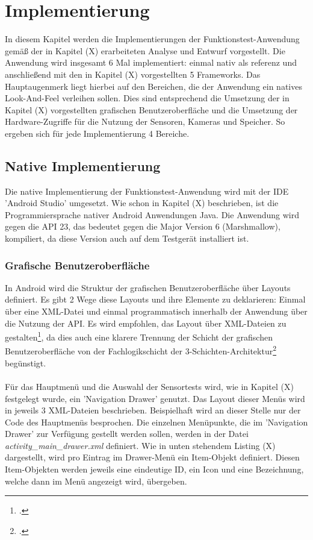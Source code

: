 \chapter{Implementierung}

In diesem Kapitel werden die Implementierungen der Funktionstest-Anwendung gemäß der in Kapitel (X) erarbeiteten Analyse und Entwurf vorgestellt. Die Anwendung wird insgesamt 6 Mal implementiert: einmal nativ als referenz und anschließend mit den in Kapitel (X)  vorgestellten 5 Frameworks. Das Hauptaugenmerk liegt hierbei auf den Bereichen, die der Anwendung ein natives Look-And-Feel verleihen sollen. Dies sind entsprechend die Umsetzung der in Kapitel (X) vorgestellten grafischen Benutzeroberfläche und die Umsetzung der Hardware-Zugriffe für die Nutzung der Sensoren, Kameras und Speicher. So ergeben sich für jede Implementierung 4 Bereiche.

\section{Native Implementierung}

Die native Implementierung der Funktionstest-Anwendung wird mit der IDE 'Android Studio' umgesetzt. Wie schon in Kapitel (X) beschrieben, ist die Programmiersprache nativer Android Anwendungen Java. Die Anwendung wird gegen die API 23, das bedeutet gegen die Major Version 6 (Marshmallow), kompiliert, da diese Version auch auf dem Testgerät installiert ist. 

\subsection{Grafische Benutzeroberfläche}

In Android wird die Struktur der grafischen Benutzeroberfläche über Layouts definiert. Es gibt 2 Wege diese Layouts und ihre Elemente zu deklarieren: Einmal über eine XML-Datei und einmal programmatisch innerhalb der Anwendung über die Nutzung der API. Es wird empfohlen, das Layout über XML-Dateien zu gestalten\footcite{AndroidAPI}, da dies auch eine klarere Trennung der Schicht der grafischen Benutzeroberfläche von der Fachlogikschicht der 3-Schichten-Architektur\footcite{SWTBalzert} begünstigt. 
\\
\\
Für das Hauptmenü und die Auswahl der Sensortests wird, wie in Kapitel (X) festgelegt wurde, ein 'Navigation Drawer' genutzt. Das Layout dieser Menüs wird in jeweils 3 XML-Dateien beschrieben. Beispielhaft wird an dieser Stelle nur der Code des Hauptmenüs besprochen. Die einzelnen Menüpunkte, die im 'Navigation Drawer' zur Verfügung gestellt werden sollen, werden in der Datei \textit{activity\_main\_drawer.xml} definiert. Wie in unten stehendem Listing (X) dargestellt, wird pro Eintrag im Drawer-Menü ein Item-Objekt definiert. Diesen Item-Objekten werden jeweils eine eindeutige ID, ein Icon und eine Bezeichnung, welche dann im Menü angezeigt wird, übergeben. 

